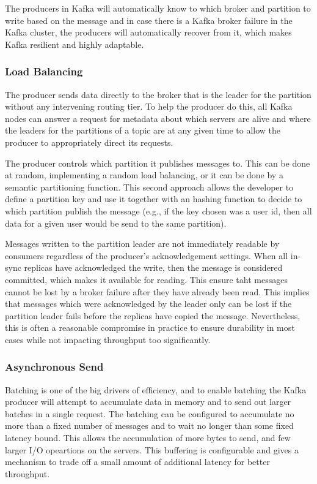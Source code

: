 The producers in Kafka will automatically know to which broker and partition to
write based on the message and in case there is a Kafka broker failure in the
Kafka cluster, the producers will automatically recover from it, which makes
Kafka resilient and highly adaptable.

\subsubsection{Load Balancing}

The producer sends data directly to the broker that is the leader for the
partition without any intervening routing tier. To help the producer do this,
all Kafka nodes can answer a request for metadata about which servers are alive
and where the leaders for the partitions of a topic are at any given time to
allow the producer to appropriately direct its requests.

The producer controls which partition it publishes messages to. This can be
done at random, implementing a random load balancing, or it can be done by a
semantic partitioning function.
This second approach allows the developer to define a partition key and use it
together with an hashing function to decide to which partition publish the
message (e.g., if the key chosen was a user id, then all data for a given user
would be send to the same partition).

Messages written to the partition leader are not immediately readable by
consumers regardless of the producer's acknowledgement settings.
When all in-sync replicas have acknowledged the write, then the message is
considered committed, which makes it available for reading.
This ensure taht messages cannot be lost by a broker failure after they have
already been read. This implies that messages which were acknowledged by the
leader only can be lost if the partition leader fails before the replicas have
copied the message. Nevertheless, this is often a reasonable compromise in
practice to ensure durability in most cases while not impacting throughput too
significantly.

\subsubsection{Asynchronous Send}

Batching is one of the big drivers of efficiency, and to enable batching the
Kafka producer will attempt to accumulate data in memory and to send out
larger batches in a single request. The batching can be configured to
accumulate no more than a fixed number of messages and to wait no longer than
some fixed latency bound. This allows the accumulation of more bytes to send,
and few larger I/O opeartions on the servers. This buffering is configurable
and gives a mechanism to trade off a small amount of additional latency for
better throughput.

